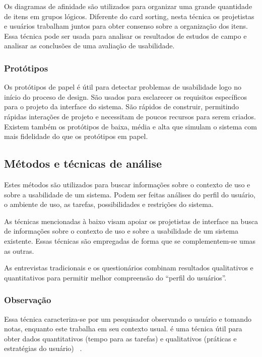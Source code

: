 	Os diagramas de afinidade são utilizados para organizar uma grande quantidade de itens em grupos lógicos. Diferente do card sorting, nesta técnica os projetistas e usuários trabalham juntos para obter consenso sobre a organização dos itens. Essa técnica pode ser usada para analisar os resultados de estudos de campo e analisar as conclusões de uma avaliação de usabilidade.

\subsubsection{Protótipos}

	Os protótipos de papel é útil para detectar problemas  de usabilidade logo no início do proceso de design. São usados para esclarecer os requisitos específicos para o projeto da interface do sistema.
	São rápidos de construir, permitindo rápidas interações de projeto e necessitam de poucos recursos para serem criados. 
	Existem também os protótipos de baixa, média e alta que simulam o sistema com mais fidelidade do que os protótipos em papel. 


\subsection{Métodos e técnicas de análise}

Estes métodos são utilizados para buscar informações sobre o contexto de uso e sobre a usabilidade de um sistema. Podem ser feitas análises do perfil do usuário, o ambiente de uso, as tarefas, possibilidades e restrições do sistema.

As técnicas mencionadas à baixo visam apoiar os projetistas de interface na busca de informações sobre o contexto de uso e sobre a usabilidade de um sistema existente. Essas técnicas são empregadas de forma que se complementem-se umas as outras.

As entrevistas tradicionais e os questionários combinam resultados qualitativos e quantitativos para permitir melhor compreensão do “perfil do usuários”.
	

\subsubsection{Observação}

Essa técnica caracteriza-se por um pesquisador observando o usuário e tomando notas, enquanto este trabalha em seu contexto usual. é uma técnica útil para obter dados quantitativos (tempo para as tarefas) e qualitativos (práticas e estratégias do usuário) ~\cite{cybis2010}.

